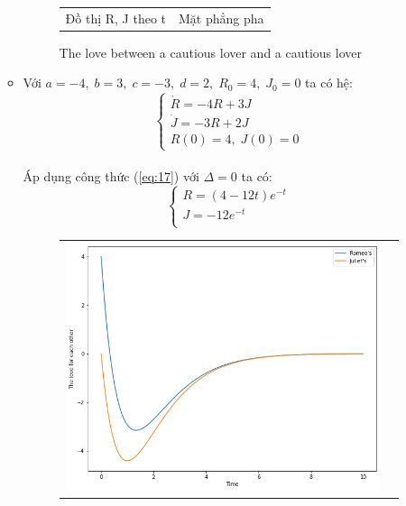\documentclass[a4paper]{article}
\begin{document}
\begin{enumerate}
\begin{itemize}
\begin{figure}[htp]
\begin{tabular}{cc}
            Đồ thị R, J theo t & Mặt phẳng pha
        \end{tabular}
        \caption{The love between a cautious lover and a cautious lover}
    \end{figure}
    \item Với $a = -4,\;b = 3,\;c = -3,\;d = 2,\;R_0 = 4,\;J_0 = 0$ ta có hệ:
    $$\begin{cases} \dot{R}=-4R+3J \\ \dot{J}=-3R+2J \\ R(0)=4,\;J(0)=0 \end{cases}$$ \\
    Áp dụng công thức (\ref{eq:17}) với $\Delta = 0$ ta có:
    $$\begin{cases}
        R = (4 - 12t)e^{-t} \\
        J = -12e^{-t} \\
    \end{cases}$$
    \begin{figure}[htp]
        \centering
        \begin{tabular}{cc}
            \includegraphics[scale = .33]{Images/Bt2/8.2_gr.png} &

\end{tabular}
\end{figure}
\end{itemize}
\end{enumerate}
\end{document}
